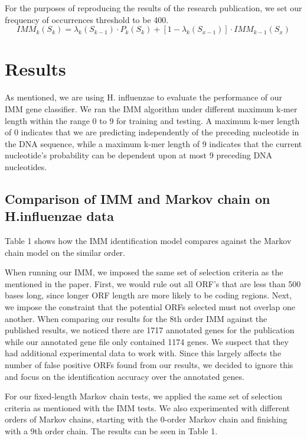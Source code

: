 \documentclass[11pt,letterpaper]{article}
\begin{document}
For the purposes of reproducing the results of the research publication, we set our frequency of occurrences threshold to be 400. 
\begin{equation}
IMM_k(S_k) = \lambda_k(S_{k-1}) \cdot P_k(S_k) + [1 - \lambda_k(S_{x-1})] \cdot IMM_{k-1}(S_x)
\end{equation}


\section{Results}

As mentioned, we are using H. influenzae to evaluate the performance of our IMM gene classifier. We ran the IMM algorithm under different maximum k-mer length within the range 0 to 9 for training and testing. A maximum k-mer length of 0 indicates that we are predicting independently of the preceding nucleotide in the DNA sequence, while a maximum k-mer length of 9 indicates that the current nucleotide’s probability can be dependent upon at most 9 preceding DNA nucleotides. 

\subsection{Comparison of IMM and Markov chain on H.influenzae data}
Table 1 shows how the IMM identification model compares against the Markov chain model on the similar order.

When running our IMM, we imposed the same set of selection criteria as the mentioned in the paper. First, we would rule out all ORF’s that are less than 500 bases long, since longer ORF length are more likely to be coding regions. Next, we impose the constraint that the potential ORFs selected must not overlap one another. When comparing our results for the 8th order IMM against the published results, we noticed there are 1717 annotated genes for the publication while our annotated gene file only contained 1174 genes. We suspect that they had additional experimental data to work with. Since this largely affects the number of false positive ORFs found from our results, we decided to ignore this and focus on the identification accuracy over the annotated genes. 

For our fixed-length Markov chain tests, we applied the same set of selection criteria as mentioned with the IMM tests. We also experimented with different orders of Markov chains, starting with the 0-order Markov chain and finishing with a 9th order chain. The results can be seen in Table 1. 
\end{document}
